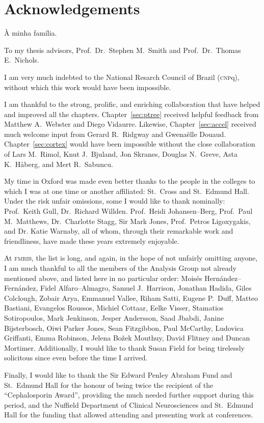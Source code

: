 \chapter*{Acknowledgements}
\setstretch{\lspac}

\noindent
\`{A} minha fam\'{i}lia.

\vspace{3mm}\noindent
To my thesis advisors, Prof.\ Dr.\ Stephen M.\ Smith and Prof.\ Dr.\ Thomas E.\ Nichols.

\vspace{3mm}\noindent
I am very much indebted to the National Resarch Council of Brazil (\textsc{cnp}q), without which this work would have been impossible.

\vspace{3mm}\noindent
I am thankful to the strong, prolific, and enriching collaboration that have helped and improved all the chapters. Chapter~\ref{sec:ptree} received helpful feedback from Matthew A.\ Webster and Diego Vidaurre. Likewise, Chapter~\ref{sec:accel} received much welcome input from Gerard R.\ Ridgway and Gwena\"{e}lle Douaud. Chapter~\ref{sec:cortex} would have been impossible without the close collaboration of Lars M.\ Rimol, Knut J.\ Bjuland, Jon Skranes, Douglas N.\ Greve, Asta K.\ H{\aa}berg, and Mert R.\ Sabuncu.

\vspace{3mm}\noindent
My time in Oxford was made even better thanks to the people in the colleges to which I was at one time or another affiliated: St.\ Cross and St.\ Edmund Hall. Under the risk unfair omissions, some I would like to thank nominally: Prof.\ Keith Gull, Dr.\ Richard Willden. Prof.\ Heidi Johansen--Berg, Prof.\ Paul M.\ Matthews, Dr.\ Charlotte Stagg, Sir Mark Jones, Prof.\ Petros Ligoxygakis, and Dr. Katie Warnaby, all of whom, through their remarkable work and friendliness, have made these years extremely enjoyable.

\vspace{3mm}\noindent
At \textsc{fmrib}, the list is long, and again, in the hope of not unfairly omitting anyone, I am much thankful to all the members of the Analysis Group not already mentioned above, and listed here in no particular order: Mois{\'e}s Hern{\'a}ndez--Fern{\'a}ndez, Fidel Alfaro--Almagro, Samuel J.\ Harrison, Jonathan Hadida, Giles Colclough, Zobair Arya, Emmanuel Vallee, Riham Satti, Eugene P.\ Duff, Matteo Bastiani, Evangelos Roussos, Michiel Cottaar, Eelke Visser, Stamatios Sotiropoulos, Mark Jenkinson, Jesper Andersson, Saad Jbabdi, Janine Bijsterbosch,  Oiwi Parker Jones, Sean Fitzgibbon, Paul McCarthy, Ludovica Griffanti, Emma Robinson, Jelena Bo\v{z}ek Mouthuy, David Flitney and Duncan Mortimer. Additionally, I would like to thank Susan Field for being tirelessly solicitous since even before the time I arrived.

\vspace{3mm}\noindent
Finally, I would like to thank the Sir Edward Penley Abraham Fund and St.\ Edmund Hall for the honour of being twice the recipient of the ``Cephalosporin Award'', providing the much needed further support during this period, and the Nuffield Department of Clinical Neurosciences and St.\ Edmund Hall for the funding that allowed attending and presenting work at conferences.
